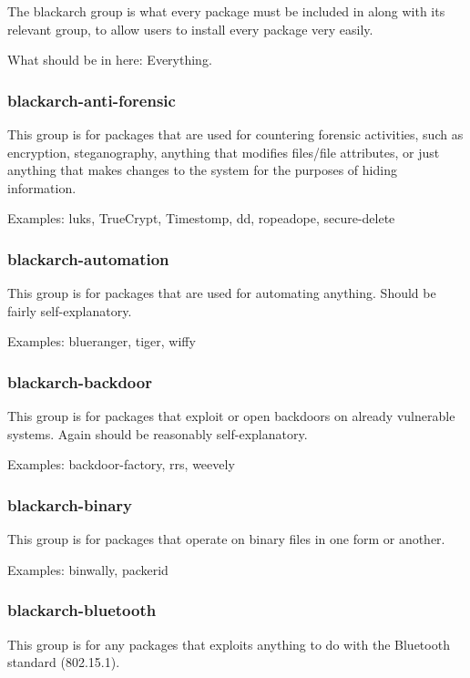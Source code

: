 \documentclass[a4paper, oneside, 11pt]{book}
\begin{document}
The blackarch group is what every package must be included in along with its relevant group, to allow users to install every package very easily.

What should be in here: Everything.

\subsubsection{blackarch-anti-forensic}

This group is for packages that are used for countering forensic activities, such as encryption, steganography, anything that modifies files/file attributes, or just anything that makes changes to the system for the purposes of hiding information.

Examples: luks, TrueCrypt, Timestomp, dd, ropeadope, secure-delete

\subsubsection{blackarch-automation}

This group is for packages that are used for automating anything. Should be fairly self-explanatory.

Examples: blueranger, tiger, wiffy

\subsubsection{blackarch-backdoor}

This group is for packages that exploit or open backdoors on already vulnerable systems. Again should be reasonably self-explanatory.

Examples: backdoor-factory, rrs, weevely

\subsubsection{blackarch-binary}

This group is for packages that operate on binary files in one form or another.

Examples: binwally, packerid

\subsubsection{blackarch-bluetooth}

This group is for any packages that exploits anything to do with the Bluetooth standard (802.15.1).
\end{document}
